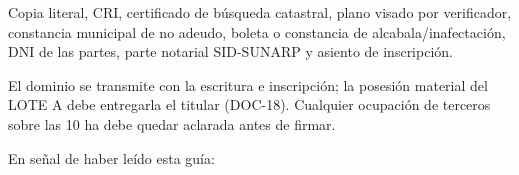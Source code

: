 \documentclass[12pt,a4paper]{article}
\begin{document}
Copia literal, CRI, certificado de búsqueda catastral, plano visado por verificador, constancia municipal de no adeudo, boleta o constancia de alcabala/inafectación, DNI de las partes, parte notarial SID-SUNARP y asiento de inscripción.

El dominio se transmite con la escritura e inscripción; la posesión material del LOTE A debe entregarla el titular (DOC-18). Cualquier ocupación de terceros sobre las 10 ha debe quedar aclarada antes de firmar.

\LugarFecha
\noindent En señal de haber leído esta guía:

\vspace{0.6em}
\end{document}
